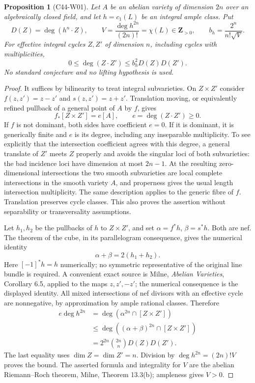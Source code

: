 \documentclass[11pt]{article}
\newtheorem{proposition}[theorem]{Proposition}
\theoremstyle{remark}\newtheorem{remark}[theorem]{Remark}
\begin{document}
\begin{proposition}[C44-W01]
Let $A$ be an abelian variety of dimension $2n$ over an algebraically
closed field, and let $h=c_1(L)$ be an integral ample class.  Put
\[
 D(Z)=\deg(h^n\cdot Z),\qquad
 V=\frac{\deg h^{2n}}{(2n)!}=\chi(L)\in\mathbf Z_{>0},\qquad
 b_h=\frac{2^n}{n!\sqrt V}.
\]
For effective integral cycles $Z,Z'$ of dimension $n$, including cycles
with multiplicities,
\begin{equation}\label{c44:algebraic-bezout}
 0\leq\deg(Z\cdot Z')\leq b_h^2D(Z)D(Z').
\end{equation}
No standard conjecture and no lifting hypothesis is used.
\end{proposition}

\begin{proof}
It suffices by bilinearity to treat integral subvarieties.  On
$Z\times Z'$ consider $f(z,z')=z-z'$ and $s(z,z')=z+z'$.  Translation
moving, or equivalently refined pullback of a general point of $A$ by
$f$, gives
\[
 f_*[Z\times Z']=e[A],\qquad e=\deg(Z\cdot Z')\geq0.
\]
If $f$ is not dominant, both sides have coefficient $e=0$.  If it is
dominant, it is generically finite and $e$ is its degree, including any
inseparable multiplicity.  To see explicitly that the intersection
coefficient agrees with this degree, a general translate of $Z'$ meets
$Z$ properly and avoids the singular loci of both subvarieties: the
bad incidence loci have dimension at most $2n-1$.  At the resulting
zero-dimensional intersections the two smooth subvarieties are local
complete intersections in the smooth variety $A$, and properness gives
the usual length intersection multiplicity.  The same description
applies to the generic fibre of $f$.  Translation preserves cycle
classes.  This also proves the assertion without separability or
transversality assumptions.

Let $h_1,h_2$ be the pullbacks of $h$ to $Z\times Z'$, and set
$\alpha=f^*h$, $\beta=s^*h$.  Both are nef.  The theorem of the cube,
in its parallelogram consequence, gives the numerical identity
\[
 \alpha+\beta=2(h_1+h_2).
\]
Here $[-1]^*h=h$ numerically; no symmetric representative of the
original line bundle is required.  A convenient exact source is
Milne, \emph{Abelian Varieties}, Corollary 6.5, applied to the maps
$z,z',-z'$; the numerical consequence is the displayed identity.
All mixed intersections of nef divisors with an effective cycle are
nonnegative, by approximation by ample rational classes.  Therefore
\begin{align*}
 e\deg h^{2n}
 &=\deg(\alpha^{2n}\cap[Z\times Z'])\\
 &\leq\deg((\alpha+\beta)^{2n}\cap[Z\times Z'])\\
 &=2^{2n}\binom{2n}{n}D(Z)D(Z').
\end{align*}
The last equality uses $\dim Z=\dim Z'=n$.  Division by
$\deg h^{2n}=(2n)!V$ proves the bound.  The asserted formula and
integrality for $V$ are the abelian Riemann--Roch theorem, Milne,
Theorem 13.3(b); ampleness gives $V>0$.
\end{proof}
\end{document}
